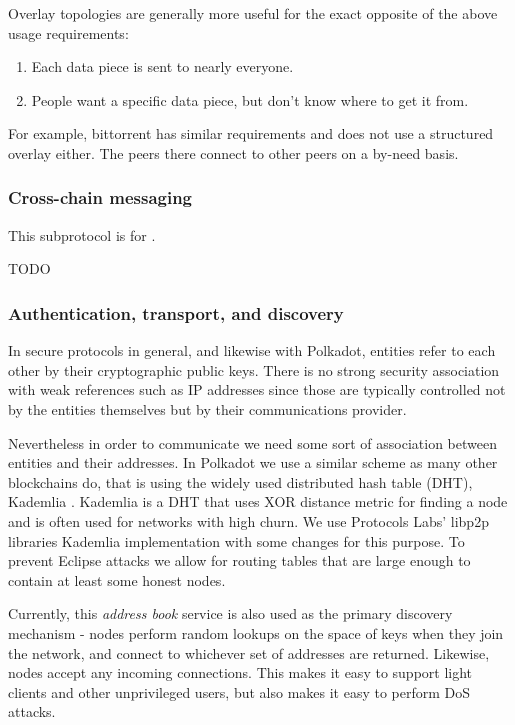 Overlay topologies are generally more useful for the exact opposite of the
above usage requirements:

\begin{enumerate}
\item Each data piece is sent to nearly everyone.
\item People want a specific data piece, but don't know where to get it from.
\end{enumerate}

For example, bittorrent has similar requirements and does not use a structured
overlay either. The peers there connect to other peers on a by-need basis.

\subsubsection{Cross-chain messaging} \label{sec:net_crosschain}

This subprotocol is for .

TODO

\subsubsection{Authentication, transport, and discovery} \label{sec:net_lowlevel}

In secure protocols in general, and likewise with Polkadot, entities refer to each other by their cryptographic public keys. There is no strong security association with weak references such as IP addresses since those are typically controlled not by the entities themselves but by their communications provider.

Nevertheless in order to communicate we need some sort of association between entities and their addresses. In Polkadot we use a similar scheme as many other blockchains do, that is using the widely used distributed hash table (DHT), Kademlia \cite{Maymounkov:2002:Kademila}. Kademlia is a DHT that uses XOR distance metric for finding a node and is often used for networks with high churn. We use Protocols Labs' libp2p libraries \cite{} Kademlia implementation with some changes for this purpose. To prevent Eclipse attacks \cite{eclipseattack} we allow for routing tables that are large enough to contain at least some honest nodes.

Currently, this \emph{address book} service is also used as the primary discovery mechanism - nodes perform random lookups on the space of keys when they join the network, and connect to whichever set of addresses are returned. Likewise, nodes accept any incoming connections. This makes it easy to support light clients and other unprivileged users, but also makes it easy to perform DoS attacks.

